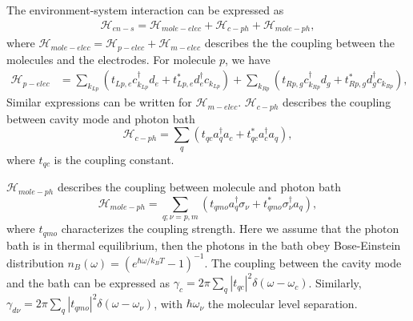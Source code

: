 \documentclass[aps,prb,
superscriptaddress,
,floatfix,footinbib,longbibliography,
preprint
]{revtex4-2}
\begin{document}
{The environment-system interaction can be expressed as
\begin{equation}
\begin{split}
\mathcal{H}_{en-s}=\mathcal{H}_{mole-elec}+\mathcal{H}_{c-ph}+\mathcal{H}_{mole-ph},
\end{split}
\end{equation}
where $\mathcal{H}_{mole-elec}=\mathcal{H}_{p-elec}+\mathcal{H}_{m-elec}$ describes the the coupling between the molecules and the electrodes. For molecule $p$, we have
\begin{equation}
\begin{split}
\mathcal{H}_{p-elec}&=\sum_{k_{Lp}}(t_{Lp,e}c_{k_{Lp}}^{\dagger}d_{e}+t_{Lp,e}^{\ast}d_{e}^{\dagger}c_{k_{Lp}})+\sum_{k_{Rp}}(t_{Rp,g}c_{k_{Rp}}^{\dagger}d_{g}+t_{Rp,g}^{\ast}d_{g}^{\dagger}c_{k_{Rp}}),
\end{split}
\label{molecule-electrode}
\end{equation}
Similar expressions can be written for $\mathcal{H}_{m-elec}$.
%
$\mathcal{H}_{c-ph}$ describes the coupling between cavity mode and photon bath
\begin{equation}
\mathcal{H}_{c-ph}=\sum_{q}(t_{qc}a_{q}^{\dagger}a_{c}+t_{qc}^{\ast}a_{c}^{\dagger}a_{q}),
\end{equation}
where $t_{qc}$ is the coupling constant. 

$\mathcal{H}_{mole-ph}$ describes the coupling between molecule and photon bath
\begin{equation}
\mathcal{H}_{mole-ph}=\sum_{q;\nu=p,m}(t_{qmo}a_{q}^{\dagger}\sigma_{\nu}+t_{qmo}^{\ast}\sigma_{\nu}^{\dagger}a_{q}),
\end{equation}
where $t_{qmo}$ characterizes the coupling strength.
%
Here we assume that the photon bath is in thermal equilibrium, then the photons in the bath obey Bose-Einstein distribution $n_{B}(\omega)=(e^{\hbar\omega/k_{B}T}-1)^{-1}$.
The coupling between the cavity mode and the bath can be expressed as $\gamma_{c}=2\pi\sum_{q}\left| t_{qc }\right|^{2}\delta(\omega-\omega_{c})$.
Similarly, $\gamma_{d\nu}=2\pi\sum_{q}\left| t_{qmo }\right|^{2}\delta(\omega-\omega_{\nu})$, with $\hbar\omega_\nu$  the molecular level separation.

}
\end{document}
